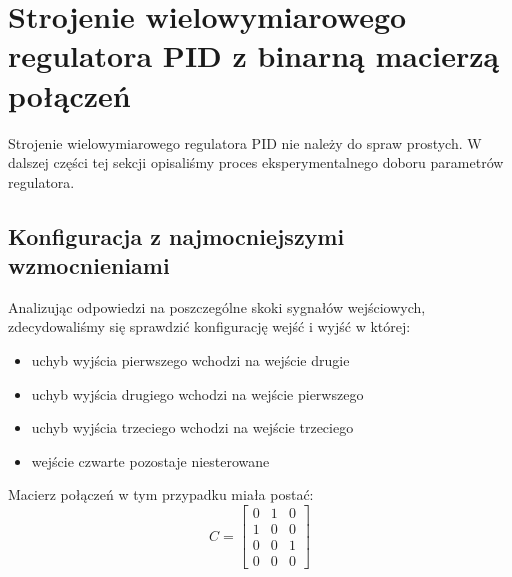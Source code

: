 \section{Strojenie wielowymiarowego regulatora PID z binarną macierzą połączeń}
\label{pro_pid_bin_conn}

Strojenie wielowymiarowego regulatora PID nie należy do spraw prostych.
W dalszej części tej sekcji opisaliśmy proces eksperymentalnego 
doboru parametrów regulatora.

\subsection{Konfiguracja z najmocniejszymi wzmocnieniami}
\label{pro_pid_konf1}

Analizując odpowiedzi na poszczególne skoki sygnałów wejściowych, zdecydowaliśmy się
sprawdzić konfigurację wejść i wyjść w której:\\

\begin{itemize}
    \item uchyb wyjścia pierwszego wchodzi na wejście drugie
    \item uchyb wyjścia drugiego wchodzi na wejście pierwszego
    \item uchyb wyjścia trzeciego wchodzi na wejście trzeciego
    \item wejście czwarte pozostaje niesterowane
\end{itemize}

\noindent Macierz połączeń w tym przypadku miała postać: \\
\[
C =
\begin{bmatrix}
    0 & 1 & 0 \\
    1 & 0 & 0 \\
    0 & 0 & 1 \\
    0 & 0 & 0 
\end{bmatrix}
\]



